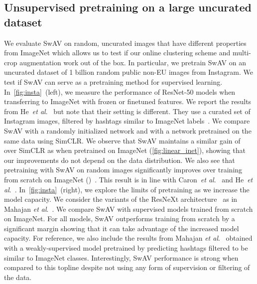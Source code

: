 \documentclass{article}
\def\onedot{.}
\def\etal{\emph{et al}\onedot}
\def\OURS{SwAV\xspace}
\begin{document}
\subsection{Unsupervised pretraining on a large uncurated dataset}
\label{sec:uncurated}
We evaluate SwAV on random, uncurated images that have different properties from ImageNet which allows us to test if our online clustering scheme and multi-crop augmentation work out of the box.
In particular, we pretrain \OURS on an uncurated dataset of 1 billion random public non-EU images from Instagram.
We test if \OURS can serve as a pretraining method for supervised learning.
In~\cref{fig:insta}~(left), we measure the performance of ResNet-50 models when transferring to ImageNet with frozen or finetuned features.
We report the results from He~\etal~\cite{he2019momentum} but note that their setting is different.
They use a curated set of Instagram images, filtered by hashtags similar to ImageNet labels~\cite{mahajan2018exploring}.
We compare \OURS with a randomly initialized network and with a network pretrained on the same data using SimCLR.
We observe that \OURS maintains a similar gain of  over SimCLR as when pretrained on ImageNet (\cref{fig:linear_inet}), showing that our improvements do not depend on the data distribution.
We also see that pretraining with \OURS on random images significantly improves over training from scratch on ImageNet ()~\cite{caron2019unsupervised,he2019momentum}.
This result is in line with Caron~\etal~\cite{caron2019unsupervised} and He~\etal~\cite{he2019momentum}.
In~\cref{fig:insta}~(right), we explore the limits of pretraining as we increase the model capacity.
We consider the variants of the ResNeXt architecture~\cite{xie2017aggregated} as in Mahajan \etal~\cite{mahajan2018exploring}.
We compare \OURS with supervised models trained from scratch on ImageNet.
For all models, \OURS outperforms training from scratch by a significant margin showing that it can take advantage of the increased model capacity.
For reference, we also include the results from Mahajan \etal~\cite{mahajan2018exploring} obtained with a weakly-supervised model pretrained by predicting hashtags filtered to be similar to ImageNet classes.
Interestingly, \OURS performance is strong when compared to this topline despite not using any form of supervision or filtering of the data. 
\end{document}
